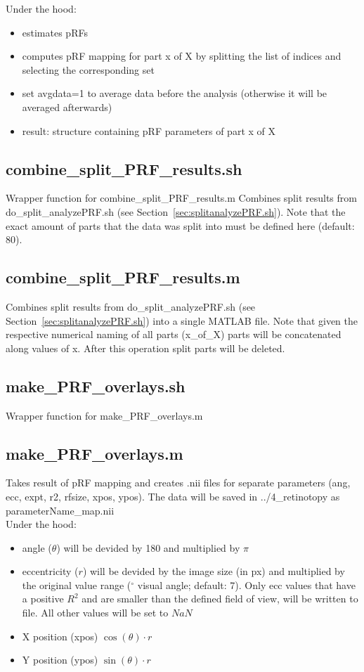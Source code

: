 \documentclass[12pt,a4paper]{scrartcl}
\begin{document}
\noindent Under the hood:
\begin{itemize}
\item estimates pRFs
\item computes pRF mapping for part x of X by splitting the list of indices and selecting the corresponding set
\item set avgdata=1 to average data before the analysis (otherwise it will be averaged afterwards)
\item result: structure containing pRF parameters of part x of X
\end{itemize}

\subsection{combine\_split\_PRF\_results.sh}
\label{sec:combsplt}
Wrapper function for combine\_split\_PRF\_results.m Combines split results from do\_split\_analyzePRF.sh (see Section~\ref{sec:splitanalyzePRF.sh}). Note that the exact amount of parts that the data was split into must be defined here (default: 80).\\

\subsection{combine\_split\_PRF\_results.m}
Combines split results from do\_split\_analyzePRF.sh (see Section~\ref{sec:splitanalyzePRF.sh}) into a single MATLAB file. Note that given the respective numerical naming of all parts (x\_of\_X) parts will be concatenated along values of x. After this operation split parts will be deleted.

\subsection{make\_PRF\_overlays.sh}
\label{sec:mkprfO}
Wrapper function for make\_PRF\_overlays.m

\subsection{make\_PRF\_overlays.m}
Takes result of pRF mapping and creates .nii files for separate parameters (ang, ecc, expt, r2, rfsize, xpos, ypos). The data will be saved in ../4\_retinotopy as parameterName\_map.nii\\

\noindent Under the hood:
\begin{itemize}
\item angle ($\theta$) will be devided by 180 and multiplied by $\pi$
\item eccentricity ($r$) will be devided by the image size (in px) and multiplied by the original value range ($^\circ$ visual angle; default: 7). Only ecc values that have a positive $R^2$ and are smaller than the defined field of view, will be written to file. All other values will be set to $NaN$
\item X position (xpos) $\cos(\theta)\cdotp r$
\item Y position (ypos) $\sin(\theta)\cdotp r$
\end{itemize}
\end{document}
